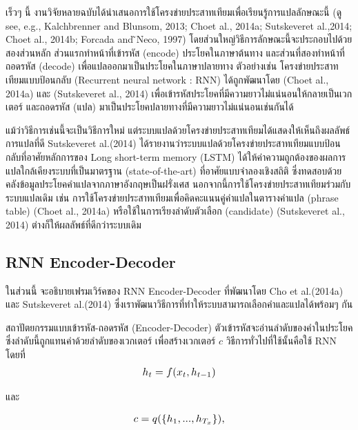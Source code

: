 \documentclass[17pt,fancychapters]{report}
\begin{document}
เร็วๆ นี้ งานวิจัยหลายฉบับได้นำเสนอการใช้โครงข่ายประสาทเทียมเพื่อเรียนรู้การแปลลักษณะนี้ (ดู see, e.g., Kalchbrenner and Blunsom, 2013; Choet al., 2014a; Sutskeveret al.,2014; Choet al., 2014b; Forcada and ̃Neco, 1997)
 โดยส่วนใหญ่วิธีการลักษณะนี้จะประกอบไปด้วยสองส่วนหลัก ส่วนแรกทำหน้าที่เข้ารหัส (encode) ประโยคในภาษาต้นทาง และส่วนที่สองทำหน้าที่ถอดรหัส (decode) เพื่อแปลออกมาเป็นประโยคในภาษาปลายทาง ตัวอย่างเช่น โครงข่ายประสาทเทียมแบบป้อนกลับ (Recurrent neural network : RNN) ได้ถูกพัฒนาโดย (Choet al., 2014a) และ (Sutskeveret al., 2014) เพื่อเข้ารหัสประโยคที่มีความยาวไม่แน่นอนให้กลายเป็นเวกเตอร์ และถอดรหัส (แปล) มาเป็นประโยคปลายทางที่มีความยาวไม่แน่นอนเช่นกันได้

แม้ว่าวิธีการเช่นนี้จะเป็นวิธีการใหม่ แต่ระบบแปลด้วยโครงข่ายประสาทเทียมได้แสดงให้เห็นถึงผลลัพธ์การแปลที่ดี Sutskeveret al.(2014) ได้รายงานว่าระบบแปลด้วยโครงข่ายประสาทเทียมแบบป้อนกลับที่อาศัยหลักการของ Long short-term memory (LSTM) ได้ให้ค่าความถูกต้องของผลการแปลใกล้เคียงระบบที่เป็นมาตรฐาน (state-of-the-art) ที่อาศัยแบบจำลองเชิงสถิติ ซึ่งทดสอบด้วยคลังข้อมูลประโยคคำแปลจากภาษาอังกฤษเป็นฝรั่งเศส นอกจากนี้การใช้โครงข่ายประสาทเทียมร่วมกับระบบแปลเดิม เช่น การใช้โครงข่ายประสาทเทียมเพื่อคิดคะแนนคู่คำแปลในตารางคำแปล (phrase table) (Choet al., 2014a) หรือใช้ในการเรียงลำดับตัวเลือก (candidate) (Sutskeveret al., 2014) ต่างก็ให้ผลลัพธ์ที่ดีกว่าระบบเดิม

\subsection{RNN Encoder-Decoder}

ในส่วนนี้ จะอธิบายเฟรมเวิร์คของ RNN Encoder-Decoder ที่พัฒนาโดย Cho et al.(2014a) และ Sutskeveret al.(2014) ซึ่งเราพัฒนาวิธีการที่ทำให้ระบบสามารถเลือกคำและแปลได้พร้อมๆ กัน

สถาปัตยกรรมแบบเข้ารหัส-ถอดรหัส (Encoder-Decoder) ตัวเข้ารหัสจะอ่านลำดับของคำในประโยค ซึ่งลำดับนี้ถูกแทนค่าด้วยลำดับของเวกเตอร์   เพื่อสร้างเวกเตอร์ $ c $ วิธีการทั่วไปที่ใช้นั้นคือใช้ RNN โดยที่
\begin{equation}
\scalebox{1.1}{$ h_t = f(x_t,h_{t-1}) $}
\end{equation}

\noindent และ

\begin{equation}
\scalebox{1.1}{$ c = q(\{h_1,...,h_{T_x}\}), $}
\end{equation}
\end{document}
